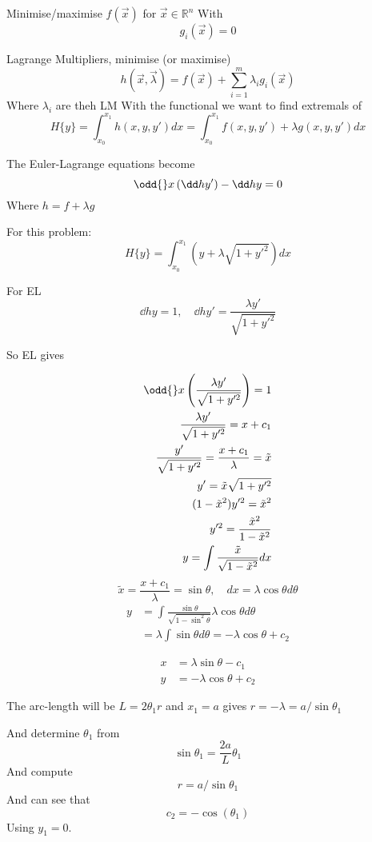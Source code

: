 \documentclass{E:/Documents/Latex/myassignment}
\begin{document}
Minimise/maximise $f(\vec x)$ for $\vec x \in \mathbb{R}^n$
With
\[g_i(\vec x) = 0\]

Lagrange Multipliers, minimise (or maximise)
\[h(\vec x, \vec \lambda) = f(\vec x) + \sum_{i=1}^m \lambda_i g_i(\vec x)\]
Where $\lambda_i$ are theh LM
With the functional we want to find extremals of
\[H\{y\} = \int_{x_0}^{x_1} h(x,y,y') dx = \int_{x_0}^{x_1} f(x,y,y') + \lambda g(x,y,y') dx\]

The Euler-Lagrange equations become
\[\odd{}x \left(\dd h{y'}\right) - \dd hy = 0\]
Where $h = f + \lambda g$


For this problem:
\[H\{y\} = \int_{x_0}^{x_1} \left(y + \lambda \sqrt{1 + y'^2}\right) dx\]

For EL 
\[\dd hy = 1, \quad \dd h{y'} = \frac{\lambda y'}{\sqrt{1+y'^2}}\]

So EL gives

\begin{align*}
	\odd{}x \left(\frac{\lambda y'}{\sqrt{1+y'^2}}\right) = 1\\
		\frac{\lambda y'}{\sqrt{1+y'^2}} = x + c_1\\
		\frac{y'}{\sqrt{1+y'^2}} = \frac{x + c_1}{\lambda} = \tilde{x}\\
		y' = \tilde{x} \sqrt{1+y'^2}\\
		(1-\tilde{x}^2)y'^2 = \tilde{x}^2\\
		y'^2 = \frac{\tilde{x}^2}{1-\tilde{x}^{2}}\\
		y = \int \frac{\tilde{x}}{\sqrt{1-\tilde{x}^2}} dx\\
\end{align*}
\[\tilde{x} = \frac{x+c_1}{\lambda} = \sin\theta, \quad dx = \lambda \cos\theta d\theta\]
\begin{align*}
	y &= \int \frac{\sin\theta}{\sqrt{1-\sin^2\theta}} \lambda \cos\theta d\theta\\
	&= \lambda \int \sin\theta d\theta = - \lambda \cos\theta + c_2
\end{align*}

\begin{align*}
	x &= \lambda \sin\theta - c_1\\
	y &= - \lambda\cos\theta + c_2
\end{align*}

The arc-length will be $L = 2\theta_1r$ and $x_1 = a$ gives $r = -\lambda = a/\sin\theta_1$

And determine $\theta_1$ from 
\[\sin\theta_1 = \frac{2a}{L} \theta_1\]
And compute
\[r = a/\sin\theta_1\]
And can see that
\[c_2 = -\cos(\theta_1)\]
Using $y_1 = 0$.
\end{document}
